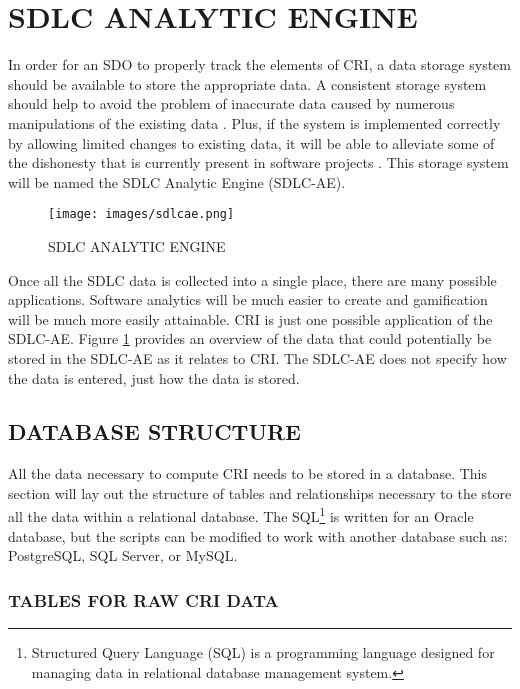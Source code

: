 \documentclass[SDSUThesis.tex]{subfiles}
\begin{document}
\section{SDLC ANALYTIC ENGINE}
\label{sec:SDLC-AE}

    In order for an SDO to properly track the elements of CRI, a data storage 
    system should be available to store the appropriate data.  A consistent 
    storage system should help to avoid the problem of inaccurate
    data caused by numerous manipulations of the existing data 
    \cite{Olson2003}. Plus, if the system
    is implemented correctly by allowing limited changes to existing data, 
    it will be able to alleviate
    some of the dishonesty that is currently present in software projects 
    \cite{Rost2011}. This storage system will be named the SDLC Analytic 
    Engine (SDLC-AE). 
    
    \begin{figure}[hbt]
        \texttt{[image: images/sdlcae.png]}
        \caption{SDLC ANALYTIC ENGINE}
        \label{fig:sdlc-ae}
    \end{figure}
    
    
    Once all the SDLC data is collected into a single place, there are 
    many possible applications.  Software analytics
    will be much easier to create and gamification will be much more easily attainable.  
    CRI is just one possible application of the SDLC-AE.  Figure \ref{fig:sdlc-ae} 
    provides an overview of 
    the data that could potentially be stored in the SDLC-AE as it relates to CRI. The
    SDLC-AE does not specify how the data is entered, just how the data is stored.
    
    \subsection{DATABASE STRUCTURE}
        All the data necessary to compute CRI needs to be stored in a database.  This section will 
        lay out the structure of tables and relationships necessary to the store all the data
        within a relational database.  The SQL\footnote{Structured Query Language (SQL) is 
        a programming language designed for managing data in relational database 
        management system.} 
        is written for an Oracle
        database, but the scripts can be modified to work with another database
        such as: PostgreSQL, SQL Server, or MySQL.  
        
        \subsubsection{TABLES FOR RAW CRI DATA}
        
\end{document}
